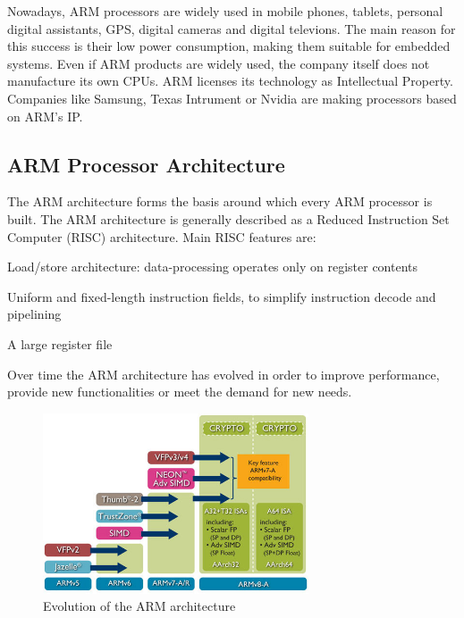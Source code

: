 \documentclass[pdftex,10pt,a4paper]{report}
\newenvironment{packed_item}{
\begin{itemize}
  \setlength{\itemsep}{1pt}
  \setlength{\parskip}{0pt}
  \setlength{\parsep}{0pt}
}{\end{itemize}}
\begin{document}
Nowadays, ARM processors are widely used in mobile phones, tablets, personal digital assistants, GPS, digital cameras and digital televions. The main reason for this success is their low power consumption, making them suitable for embedded systems. Even if ARM products are widely used, the company itself does not manufacture its own CPUs. ARM licenses its technology as Intellectual Property. Companies like Samsung, Texas Intrument or Nvidia are making processors based on ARM's IP.

\subsection{ARM Processor Architecture}
The ARM architecture forms the basis around which every ARM processor is built. The ARM architecture is generally described as a Reduced Instruction Set Computer (RISC) architecture. Main RISC features are:
\begin{packed_item}
	\item Load/store architecture: data-processing operates only on register contents
	\item Uniform and fixed-length instruction fields, to simplify instruction decode and pipelining
	\item A large register file
\end{packed_item}

Over time the ARM architecture has evolved in order to improve performance, provide new functionalities or meet the demand for new needs.
\begin{figure}[h!]
\centering
\includegraphics[width=0.7\textwidth]{./arm_arch.jpg}
\caption{Evolution of the ARM architecture}
\label{Evolution of the ARM architecture}
\end{figure}
\end{document}
